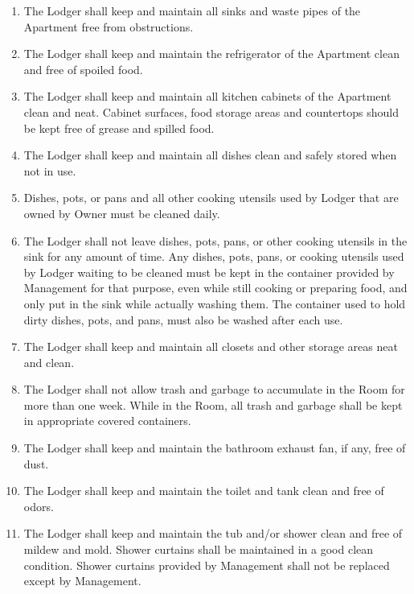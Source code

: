 \documentclass[12pt,letterpaper]{article}
\newcommand{\lodger}{Lodger}
\newcommand{\management}{Management}
\newcommand{\apt}{Apartment}
\newcommand{\room}{Room}
\begin{document}
\begin{enumerate}
	\item The \lodger{} shall keep and maintain all sinks and waste pipes of the \apt{} free from obstructions. 
	\item The \lodger{} shall keep and maintain the refrigerator of the \apt{} clean and free of spoiled food.
	\item The \lodger{} shall keep and maintain all kitchen cabinets of the \apt{} clean and neat. Cabinet surfaces, food storage areas and countertops should be kept free of grease and spilled food. 
	\item The \lodger{} shall keep and maintain all dishes clean and safely stored when not in use. 
	\item Dishes, pots, or pans and all other cooking utensils used by \lodger{} that are owned by Owner must be cleaned daily.
	\item The \lodger{} shall not leave dishes, pots, pans, or other cooking utensils in the sink for any amount of time. Any dishes, pots, pans, or cooking utensils used by \lodger{} waiting to be cleaned must be kept in the container provided by \management{} for that purpose, even while still cooking or preparing food, and only put in the sink while actually washing them. The container used to hold dirty dishes, pots, and pans, must also be washed after each use.
	\item The \lodger{} shall keep and maintain all closets and other storage areas neat and clean. 
	\item The \lodger{} shall not allow trash and garbage to accumulate in the \room{} for more than one week. While in the \room{}, all trash and garbage shall be kept in appropriate covered containers. 
	\item The \lodger{} shall keep and maintain the bathroom exhaust fan, if any, free of dust. 
	\item The \lodger{} shall keep and maintain the toilet and tank clean and free of odors. 
	\item The \lodger{} shall keep and maintain the tub and/or shower clean and free of mildew and mold. Shower curtains shall be maintained in a good clean condition. Shower curtains provided by \management{} shall not be replaced except by \management{}.
\end{enumerate}
\end{document}
